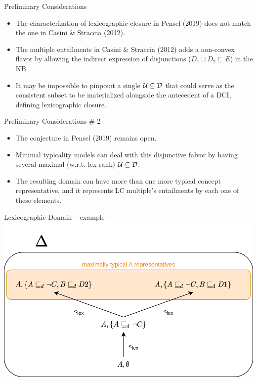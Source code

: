 \documentclass[10pt]{beamer}
\begin{document}
\begin{frame}[fragile]{Preliminary Considerations}
  \begin{itemize}
    \item The characterization of lexicographic closure in Pensel (2019) does not match the one in Casini \& Straccia (2012). \pause 
    \item The multiple entailments in Casini \& Straccia (2012) adds a non-convex flavor by allowing the indirect expression of disjunctions (\eg $D_1 \sqcup D_2 \sqsubseteq E$) in the KB. \pause 
    \item It may be impossible to pinpoint a single $\mathcal{U} \subseteq \mathcal{D}$ that could serve as the consistent subset to be materialized alongside the antecedent of a DCI, defining lexicographic closure. 
  \end{itemize}
\end{frame}

\begin{frame}[fragile]{Preliminary Considerations \# 2}
  \begin{itemize}
    \item The conjecture in Pensel (2019) remains open. \pause 
    \item Minimal typicality models can deal with this disjunctive falvor by having several maximal (w.r.t. lex rank) $\mathcal{U} \subseteq \mathcal{D}$. \pause
    \item The resulting domain can have more than one more typical concept representative, and it represents LC multiple's entailments by each one of these elements.
  \end{itemize}
\end{frame}

\begin{frame}[fragile]{Lexicographic Domain -- example}
  \includegraphics[scale=.32]{img/lexdomain.png}
\end{frame}
\end{document}
